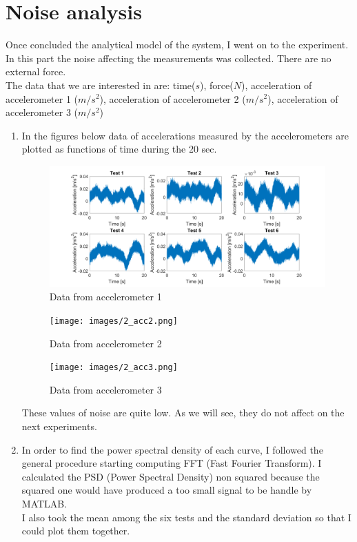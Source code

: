 \documentclass[11pt,a4paper]{article}
\begin{document}
\section{Noise analysis}
Once concluded the analytical model of the system, I went on to the experiment. In this part the noise affecting the measurements was collected. There are no external force. \\
The data that we are interested in are: time($s$), force($N$), acceleration of accelerometer 1 ($m/s^2$), acceleration of accelerometer 2 ($m/s^2$), acceleration of accelerometer 3 ($m/s^2$)

\begin{enumerate}	
	\item In the figures below data of accelerations measured by the accelerometers are plotted as functions of time during the 20 sec.
	
	\begin{figure}[H]
		\centering
		\includegraphics[width=175mm]{images/2_acc1.png}
		\caption{Data from accelerometer 1}
	\end{figure}
	
	\begin{figure}[H]
		\centering
		\texttt{[image: images/2\_acc2.png]}
		\caption{Data from accelerometer 2}
	\end{figure}

	\begin{figure}[H]
		\centering
		\texttt{[image: images/2\_acc3.png]}
		\caption{Data from accelerometer 3}
	\end{figure}
	
	These values of noise are quite low. As we will see, they do not affect on the next experiments.
	
	\medskip
	 
	\item In order to find the power spectral density of each curve, I followed the general procedure starting computing FFT (Fast Fourier Transform). I calculated the PSD (Power Spectral Density) non squared because the squared one would have produced a too small signal to be handle by MATLAB. \\
	I also took the mean among the six tests and the standard deviation so that I could plot them together. \\
	

\end{enumerate}
\end{document}
